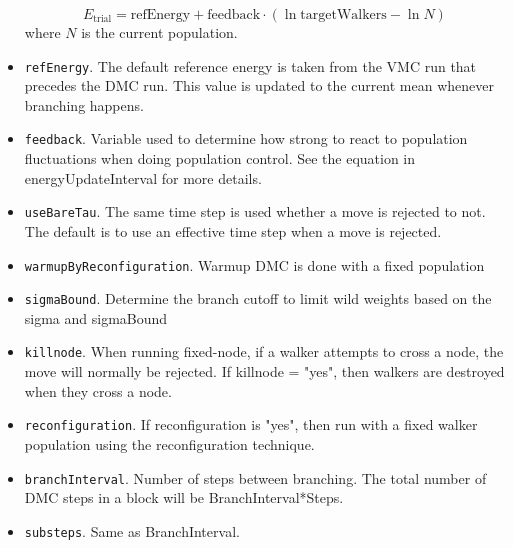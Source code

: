 \begin{itemize}
\[
E_{\text{trial}}=
\textrm{refEnergy}+\textrm{feedback}\cdot(\ln\textrm{targetWalkers}-\ln N)
\]
where $N$ is the current population.

\item \texttt{refEnergy}. The default reference energy is taken from the VMC run that precedes the DMC run. This value is updated to the current mean whenever branching happens.

\item \texttt{feedback}. Variable used to determine how strong to react to population fluctuations when doing population control.  See the equation in energyUpdateInterval for more details.

\item \texttt{useBareTau}. The same time step is used whether a move is rejected to not. The default is to use an effective time step when a move is rejected.

\item \texttt{warmupByReconfiguration}.  Warmup DMC is done with a fixed population

\item \texttt{sigmaBound}.  Determine the branch cutoff to limit wild weights based on the sigma and sigmaBound

\item \texttt{killnode}.  When running fixed-node, if a walker attempts to cross a node, the move will normally be rejected.  If killnode = "yes", then walkers are destroyed when they cross a node.


\item \texttt{reconfiguration}.  If reconfiguration is "yes", then run with a fixed walker population using the reconfiguration technique.  

\item \texttt{branchInterval}. Number of steps between branching.  The total number of DMC steps in a block will be BranchInterval*Steps.   

\item \texttt{substeps}.  Same as BranchInterval.



\end{itemize}
